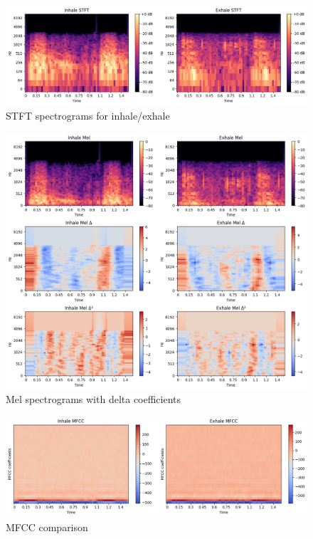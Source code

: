\begin{figure}[h!]
\centering
\includegraphics[width=\columnwidth]{figures/stft}	
\caption{STFT spectrograms for inhale/exhale}
\label{fig:stft}
\end{figure}

\begin{figure}[h!]
\centering
\includegraphics[width=\columnwidth]{figures/mel}	
\caption{Mel spectrograms with delta coefficients}
\label{fig:mel}
\end{figure}

\begin{figure}[h!]
\centering
\includegraphics[width=\columnwidth]{figures/mfcc}	
\caption{MFCC comparison}
\label{fig:mfcc}
\end{figure}

